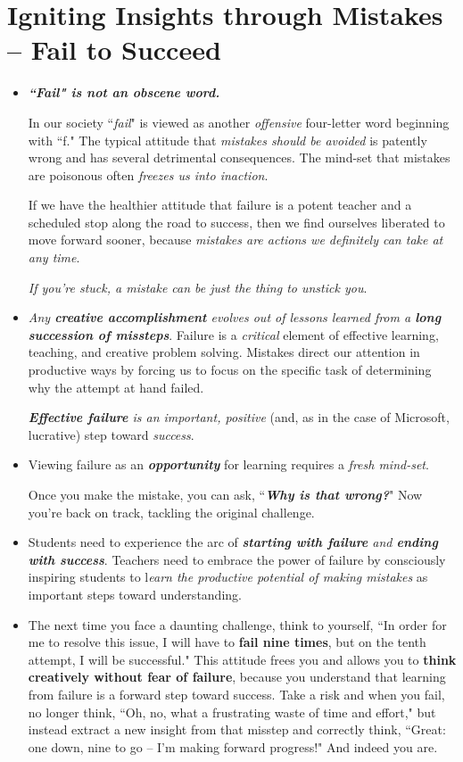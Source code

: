 \documentclass[11pt]{article}
\begin{document}
\section{Igniting Insights through Mistakes -- Fail to Succeed}
\begin{itemize}
\item \emph{\textbf{``Fail" is not an obscene word.}} 

In our society ``\emph{fail}" is viewed as another \emph{offensive} four-letter word beginning with ``f." The typical attitude that \emph{mistakes should be avoided} is patently wrong and has several detrimental consequences. The mind-set that mistakes are poisonous often \emph{freezes us into inaction}.  

If we have the healthier attitude that failure is a potent teacher and a scheduled stop along the road to success, then we find ourselves liberated to move forward sooner, because \emph{mistakes are actions we definitely can take at any time}. 

\emph{If you’re stuck, a mistake can be just the thing to unstick you}.

\item \emph{Any \textbf{creative accomplishment} evolves out of lessons learned from a \textbf{long succession of missteps}}. Failure is a \emph{critical} element of effective learning, teaching, and creative problem solving. Mistakes direct our attention in productive ways by forcing us to focus on the specific task of determining why the attempt at hand failed. 

\emph{\textbf{Effective failure} is an important, positive} (and, as in the case of Microsoft, lucrative) step toward \emph{success}.

\item Viewing failure as an \emph{\textbf{opportunity}} for learning requires a \emph{fresh mind-set}. 

Once you make the mistake, you can ask, ``\emph{\textbf{Why is that wrong?}}" Now you’re back on track, tackling the original challenge.

\item Students need to experience the arc of \emph{\textbf{starting with failure} and \textbf{ending with success}}. Teachers need to embrace the power of failure by consciously inspiring students to l\emph{earn the productive potential of making mistakes} as important steps toward understanding.

\item \begin{exercise}
The next time you face a daunting challenge, think to yourself, ``In order for me to resolve this issue, I will have to \textbf{fail nine times}, but on the tenth attempt, I will be successful." This attitude frees you and allows you to \textbf{think creatively without fear of failure}, because you understand that learning from failure is a forward step toward success. Take a risk and when you fail, no longer think, ``Oh, no, what a frustrating waste of time and effort," but instead extract a new insight from that misstep and correctly think, ``Great: one down, nine to go -- I’m making forward progress!" And indeed you are. 


\end{exercise}
\end{itemize}
\end{document}
